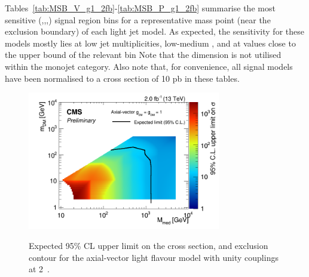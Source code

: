 Tables~\ref{tab:MSB_V_g1_2fb}-\ref{tab:MSB_P_g1_2fb} summarise the most sensitive
{(\njet,\nb,\scalht,\mht)} signal region 
bins for a representative mass point (near the exclusion boundary) of each light
jet model. As expected, the sensitivity for these models mostly lies at low jet
multiplicities, low-medium \scalht, and at \mht values close to the upper bound
of the relevant \scalht bin Note that the \mht dimension is not utilised within 
the monojet category. Also note that, for convenience, all signal models have 
been normalised to a cross section of 10 pb in these tables.

\clearpage

 
\clearpage



\clearpage

\begin{figure}
\begin{center}
\includegraphics[width=0.75\textwidth]{figures/DMplots/dm_A_g1p0_2p0fb_2dlimits.png} \\
\caption{Expected 95\% CL upper limit on the cross section, and exclusion
contour for the axial-vector light flavour model with unity couplings at 2~\ifb.}
\label{fig:dm_A_g1_2fb_2dlimits}
\end{center}
\end{figure}

